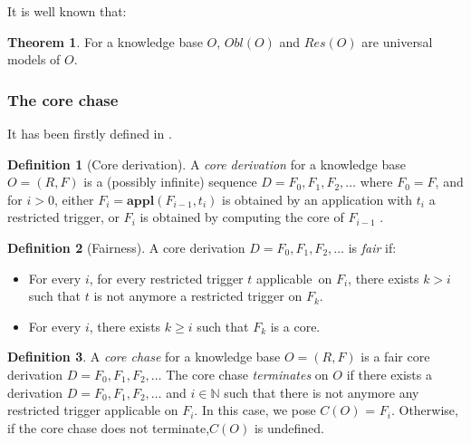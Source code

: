 \documentclass{article}
\theoremstyle{definition}
\newtheorem{definition}{Definition}[section]
\newtheorem{theorem}{Theorem}[section]
\theoremstyle{remark}
\def \N {\mathbb N}
\newcommand{\Appl}{\textbf{appl}}
\begin{document}
It is well known that:

\begin{theorem}
For a knowledge base $O$, $\textit{Obl}(O)$ and $\textit{Res}(O)$ are universal models of $O$.
\end{theorem}



\subsubsection{The core chase}

It has been firstly defined in \cite{core_chase}.

\begin{definition}[Core derivation]
A \emph{core derivation} for a knowledge base $O = (R,F)$ is a (possibly infinite) sequence $D = F_0, F_1, F_2, \ldots$ where $F_0 = F$, and for $i >0$, either $F_{i}= \Appl(F_{i-1},t_i)$ is obtained by an application with $t_i$ a restricted trigger, or $F_i$ is obtained by computing the core of $F_{i-1}$ . 
\end{definition} 

\begin{definition}[Fairness]
A core derivation $D=F_0,F_1,F_2,\ldots$ is \emph{fair} if:
\begin{itemize}
\item For every $i$, for every restricted trigger $t$ applicable\ on $F_i$, there exists $k > i$ such that $t$ is not anymore a restricted trigger on $F_k$.
\item For every $i$, there exists $k \geq i$ such that $F_k$ is a core.

\end{itemize}
\end{definition}

\begin{definition}
A \emph{core chase} for a knowledge base $O= (R,F)$ is a fair core derivation $D=F_0,F_1,F_2,\ldots$ The core chase \emph{terminates} on $O$ if there exists a derivation $D=F_0,F_1,F_2,\ldots$ and $i \in \N$ such that there is not anymore any restricted trigger applicable on $F_i$. In this case, we pose \emph{$\textit{C}(O)$} = $F_i$.
Otherwise, if the core chase does not terminate,$\textit{C}(O)$ is undefined.
\end{definition}
\end{document}
